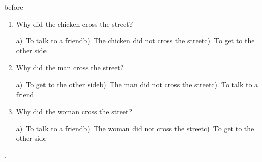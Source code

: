 \documentclass[12pt]{article}
\begin{document}
	before\begin{enumerate}\item Why did the chicken cross the street?

a)~To talk to a friend\hspace{1cm}b)~The chicken did not cross the street\hspace{1cm}c)~To get to the other side
\item Why did the man cross the street?

a)~To get to the other side\hspace{1cm}b)~The man did not cross the street\hspace{1cm}c)~To talk to a friend
\item Why did the woman cross the street?

a)~To talk to a friend\hspace{1cm}b)~The woman did not cross the street\hspace{1cm}c)~To get to the other side
\end{enumerate}
	\newpage

	.

	
\end{document}
